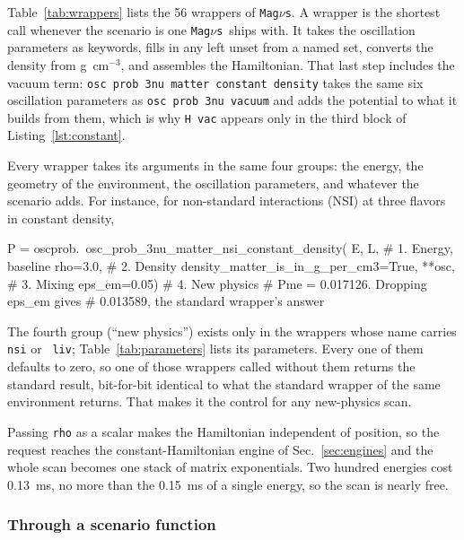 \documentclass[final,5p,times,twocolumn,sort,compress]{elsarticle}
\makeatletter
\DeclareRobustCommand{\_}{%
  \ifmmode\nfss@text{\textunderscore}\else\textunderscore\allowbreak\fi}
\newcommand{\Tab}{Table}
\newcommand{\tabl}[1]{\Tab~\ref{tab:#1}}
\newcommand{\magnus}{{\tt Mag}\ensuremath{\nu}{\tt s}}
\makeatother
\begin{document}
\tabl{wrappers} lists the 56 wrappers of \magnus. A wrapper is the shortest call whenever the scenario is one \magnus\ ships with. It takes the oscillation parameters as keywords, fills in any left unset from a named set, converts the density from g~cm$^{-3}$, and assembles the Hamiltonian. That last step includes the vacuum term: {\tt osc\_prob\_3nu\_matter\_constant\_density} takes the same six oscillation parameters as {\tt osc\_prob\_3nu\_vacuum} and adds the potential to what it builds from them, which is why {\tt H\_vac} appears only in the third block of Listing~\ref{lst:constant}.

Every wrapper takes its arguments in the same four groups: the energy, the geometry of the environment, the oscillation parameters, and whatever the scenario adds. For instance, for non-standard interactions (NSI) at three flavors in constant density,
\begin{pysnip}
P = oscprob.\
 osc_prob_3nu_matter_nsi_constant_density(
    E, L,            # 1. Energy, baseline
    rho=3.0,         # 2. Density
    density_matter_is_in_g_per_cm3=True,
    **osc,           # 3. Mixing
    eps_em=0.05)     # 4. New physics
# Pme = 0.017126.  Dropping eps_em gives
# 0.013589, the standard wrapper's answer
\end{pysnip}
The fourth group (``new physics'') exists only in the wrappers whose name carries {\tt \_nsi} or {\tt \_liv}; \tabl{parameters} lists its parameters. Every one of them defaults to zero, so one of those wrappers called without them returns the standard result, bit-for-bit identical to what the standard wrapper of the same environment returns. That makes it the control for any new-physics scan. 

Passing {\tt rho} as a scalar makes the Hamiltonian independent of position, so the request reaches the constant-Hamiltonian engine of Sec.~\ref{sec:engines} and the whole scan becomes one stack of matrix exponentials. Two hundred energies cost 0.13~ms, no more than the 0.15~ms of a single energy, so the scan is nearly free.


\subsubsection{Through a scenario function}
\end{document}

